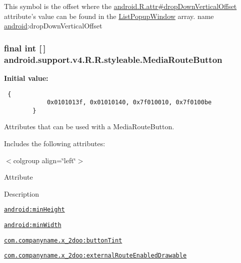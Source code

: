 This symbol is the offset where the \hyperlink{}{android.R.attr\#dropDownVerticalOffset} attribute's value can be found in the \hyperlink{classandroid_1_1support_1_1v4_1_1_r_1_1styleable_a0e1ff67246990456b474c947ecb8b7e}{ListPopupWindow} array.  name \hyperlink{namespaceandroid}{android}:dropDownVerticalOffset \hypertarget{classandroid_1_1support_1_1v4_1_1_r_1_1styleable_b8373fc29d9d3ae7c46174f3caf39215}{
\subsubsection[{MediaRouteButton}]{\setlength{\rightskip}{0pt plus 5cm}final int \mbox{[}$\,$\mbox{]} android.support.v4.R.R.styleable.MediaRouteButton}}
\label{classandroid_1_1support_1_1v4_1_1_r_1_1styleable_b8373fc29d9d3ae7c46174f3caf39215}


\textbf{Initial value:}

\begin{Code}\begin{verbatim} {
            0x0101013f, 0x01010140, 0x7f010010, 0x7f0100be
        }
\end{verbatim}
\end{Code}
Attributes that can be used with a MediaRouteButton. 

Includes the following attributes: \begin{TabularC}{0}
\hline
\end{TabularC}
$<$colgroup align=\char`\"{}left\char`\"{}$>$ 

Attribute

Description 

{\tt \hyperlink{classandroid_1_1support_1_1v4_1_1_r_1_1styleable_232cbfb4c13b07cb6d29fd924cdb6b61}{android:minHeight}}

{\tt \hyperlink{classandroid_1_1support_1_1v4_1_1_r_1_1styleable_00278b194a19a6476c38e50dde31642c}{android:minWidth}}

{\tt \hyperlink{classandroid_1_1support_1_1v4_1_1_r_1_1styleable_c0211c76c5d560a47ec498d31003f0b6}{com.companyname.x\_\-2doo:buttonTint}}

{\tt \hyperlink{classandroid_1_1support_1_1v4_1_1_r_1_1styleable_8ae8e1423dabf0e93738248e95b25fd8}{com.companyname.x\_\-2doo:externalRouteEnabledDrawable}}

